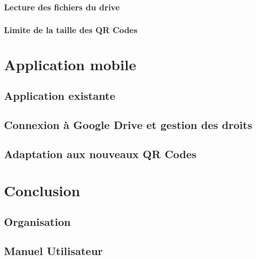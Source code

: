 \documentclass{report}
\begin{document}
		\subsection{Lecture des fichiers du drive}
			 \label{lectureDrive}
			
		\subsection{Limite de la taille des QR Codes}
			 \label{limiteTaille}

\chapter{Application mobile}

	\section{Application existante}
		
		
	\section{Connexion à Google Drive et gestion des droits}
		

	\section{Adaptation aux nouveaux QR Codes}
		

\chapter{Conclusion}
	



\addappheadtotoc
\appendixpage

\appendix

\section{Organisation}

	
		
		
\section{Manuel Utilisateur}

	 
\end{document}
